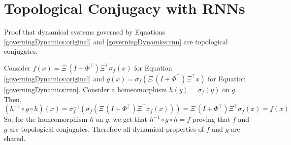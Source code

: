 \documentclass[11pt]{article}
\theoremstyle{definition}
\begin{document}
\section{Topological Conjugacy with RNNs}
%
Proof that dynamical systems governed by Equations \ref{governingDynamics:original} and \ref{governingDynamics:rnn} are topological conjugates.

Consider $f(x) = \Xi \, (I + \Phi^\top) \Xi^\top \sigma_f(x)$ for Equation \ref{governingDynamics:original} and $g(x) = \sigma_f(\Xi \, (I + \Phi^\top) \Xi^\top x)$ for Equation \ref{governingDynamics:rnn}. Consider a homeomorphism $h(y) = \sigma_f(y)$ on $g$. Then,
%
\begin{dmath}
	(h^{-1} \circ g \circ h) (x) = \sigma_f^{-1}( \sigma_f(\Xi \, (I + \Phi^\top) \Xi^\top \sigma_f(x)) ) = \Xi \, (I + \Phi^\top) \Xi^\top \sigma_f(x) = f(x)
\end{dmath}
%
So, for the homeomorphism $h$ on $g$, we get that $h^{-1} \circ g \circ h = f$ proving that $f$ and $g$ are topological conjugates. Therefore all dynamical properties of $f$ and $g$ are shared.
\end{document}
